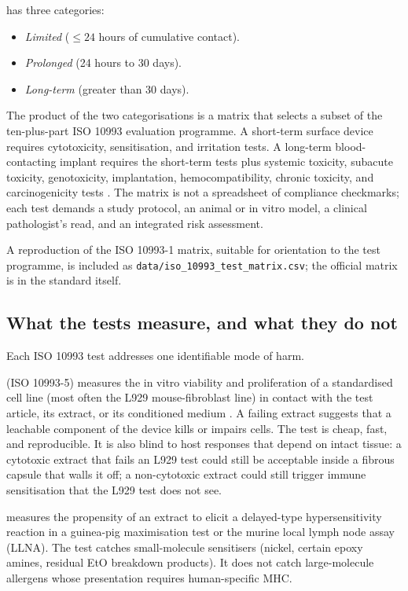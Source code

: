 has three categories:

\begin{itemize}[leftmargin=*]
\item \emph{Limited} ($\le 24$ hours of cumulative contact).
\item \emph{Prolonged} (24 hours to 30 days).
\item \emph{Long-term} (greater than 30 days).
\end{itemize}

The product of the two categorisations is a matrix that selects a
subset of the ten-plus-part ISO 10993 evaluation programme. A
short-term surface device requires cytotoxicity, sensitisation, and
irritation tests. A long-term blood-contacting implant requires the
short-term tests plus systemic toxicity, subacute toxicity,
genotoxicity, implantation, hemocompatibility, chronic toxicity,
and carcinogenicity tests
\cite{std:v6c12-iso-10993-1-2018,
method:v6c12-iso-10993-test-matrix-2020}. The matrix is not a
spreadsheet of compliance checkmarks; each test demands a study
protocol, an animal or in vitro model, a clinical pathologist's
read, and an integrated risk assessment.

A reproduction of the ISO 10993-1 matrix, suitable for orientation
to the test programme, is included as
\texttt{data/iso\_10993\_test\_matrix.csv}; the official matrix is in
the standard itself.

\subsection{What the tests measure, and what they do not}

Each ISO 10993 test addresses one identifiable mode of harm.

 (ISO 10993-5) measures the in vitro
viability and proliferation of a standardised cell line (most often
the L929 mouse-fibroblast line) in contact with the test article,
its extract, or its conditioned medium
\cite{std:v6c12-iso-10993-5-2009}. A failing extract suggests that
a leachable component of the device kills or impairs cells. The
test is cheap, fast, and reproducible. It is also blind to host
responses that depend on intact tissue: a cytotoxic extract that
fails an L929 test could still be acceptable inside a fibrous
capsule that walls it off; a non-cytotoxic extract could still
trigger immune sensitisation that the L929 test does not see.

 measures the propensity of an extract to
elicit a delayed-type hypersensitivity reaction in a guinea-pig
maximisation test or the murine local lymph node assay (LLNA).
The test catches small-molecule sensitisers (nickel, certain epoxy
amines, residual EtO breakdown products). It does not catch
large-molecule allergens whose presentation requires
human-specific MHC.

